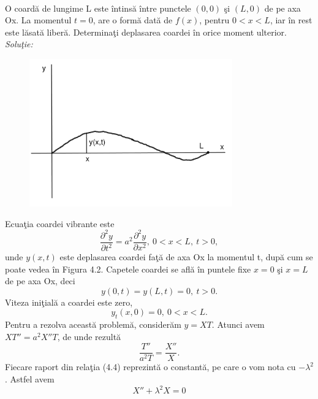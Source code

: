 \documentclass[a4paper,openany,12pt]{report}
\begin{document}
\paragraph*{}O coard\u a de lungime L este \^ intins\u a \^ intre punctele $(0,0)$ \c si $(L,0)$ de pe axa Ox. La momentul $t=0$, are o form\u a dat\u a de $f(x)$, pentru $0<x<L$, iar \^ in rest este l\u asat\u a liber\u a. Determina\c ti deplasarea coardei \^ in orice moment ulterior. 
\newline
\newline
\textit{Solu\c tie:}
\begin{figure}[H]
\centering
\includegraphics[height=2.5in]{Coarda.pdf} 
\caption{}
\end{figure}
Ecua\c tia coardei vibrante este
\begin{equation*}
\frac{\partial^2y}{\partial t^2}=a^2\frac{\partial^2y}{\partial x^2}, \: 0<x<L, \:t>0,
\end{equation*}
unde $y(x,t)$ este deplasarea coardei fa\c t\u a de axa Ox la momentul t, dup\u a cum se poate vedea \^ in Figura 4.2.
\newline
Capetele coardei se afl\u a \^ in puntele fixe $x=0$ \c si $x=L$ de pe axa Ox, deci
\begin{equation*}
y(0,t)=y(L,t)=0, \: t>0.
\end{equation*} 
Viteza ini\c tial\u a a coardei este zero, 
\begin{equation*}
y_t(x,0)=0,\: 0<x<L.
\end{equation*}
Pentru a rezolva aceast\u a problem\u a, consider\u am $y=XT$. Atunci avem $XT''=a^2X''T $, de unde rezult\u a
\begin{equation}
\frac{T''}{a^2 T}=\frac{X''}{X}.
\end{equation}
Fiecare raport din rela\c tia (4.4) reprezint\u a o constant\u a, pe care o vom nota cu $-\lambda^2$. Astfel avem
\begin{equation*}
X''+\lambda^2X=0
\end{equation*}
\end{document}
